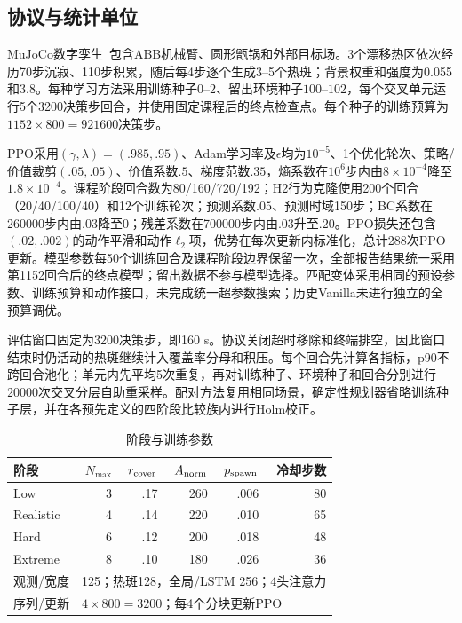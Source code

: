 \documentclass[conference]{IEEEtran}
\begin{document}
\subsection{协议与统计单位}
MuJoCo数字孪生~\cite{mujoco2012physics}包含ABB机械臂、圆形甑锅和外部目标场。3个漂移热区依次经历70步沉寂、110步积累，随后每4步逐个生成3--5个热斑；背景权重和强度为0.055和3.8。每种学习方法采用训练种子$0$--$2$、留出环境种子$100$--$102$，每个交叉单元运行5个3200决策步回合，并使用固定课程后的终点检查点。每个种子的训练预算为$1152\times800=921600$决策步。

PPO采用$(\gamma,\lambda)=(.985,.95)$、Adam学习率及$\epsilon$均为$10^{-5}$、1个优化轮次、策略/价值裁剪$(.05,.05)$、价值系数$.5$、梯度范数$.35$，熵系数在$10^6$步内由$8\times10^{-4}$降至$1.8\times10^{-4}$。课程阶段回合数为80/160/720/192；H2行为克隆使用200个回合（20/40/100/40）和12个训练轮次；预测系数$.05$、预测时域150步；BC系数在260000步内由$.03$降至0；残差系数在700000步内由$.03$升至$.20$。PPO损失还包含$(.02,.002)$的动作平滑和动作$\ell_2$项，优势在每次更新内标准化，总计288次PPO更新。模型参数每50个训练回合及课程阶段边界保留一次，全部报告结果统一采用第1152回合后的终点模型；留出数据不参与模型选择。匹配变体采用相同的预设参数、训练预算和动作接口，未完成统一超参数搜索；历史Vanilla未进行独立的全预算调优。

评估窗口固定为3200决策步，即160 s。协议关闭超时移除和终端排空，因此窗口结束时仍活动的热斑继续计入覆盖率分母和积压。每个回合先计算各指标，p90不跨回合池化；单元内先平均5次重复，再对训练种子、环境种子和回合分别进行20000次交叉分层自助重采样。配对方法复用相同场景，确定性规划器省略训练种子层，并在各预先定义的四阶段比较族内进行Holm校正。

\begin{table}[t]
\caption{阶段与训练参数}
\label{tab:stage_zh}
\centering\scriptsize\setlength{\tabcolsep}{2.2pt}
\begin{tabular}{@{}lrrrrr@{}}
\toprule
阶段 & $N_{\max}$ & $r_{\rm cover}$ & $A_{\rm norm}$ & $p_{\rm spawn}$ & 冷却步数\\
\midrule
Low & 3 & .17 & 260 & .006 & 80\\
Realistic & 4 & .14 & 220 & .010 & 65\\
Hard & 6 & .12 & 200 & .018 & 48\\
Extreme & 8 & .10 & 180 & .026 & 36\\
\midrule
观测/宽度 & \multicolumn{5}{l}{125；热斑128，全局/LSTM 256；4头注意力}\\
序列/更新 & \multicolumn{5}{l}{$4\times800=3200$；每4个分块更新PPO}\\
\bottomrule
\end{tabular}
\end{table}
\end{document}
